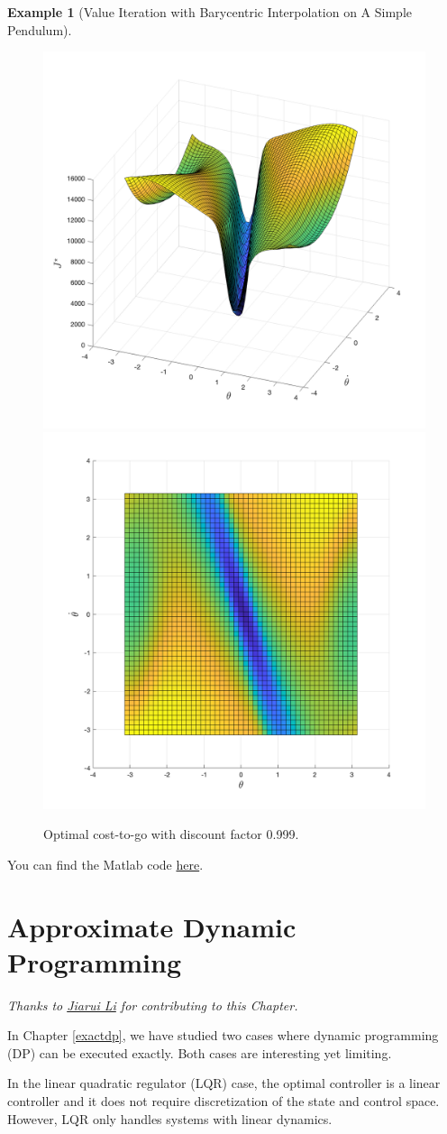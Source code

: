 \documentclass[
]{book}
\theoremstyle{definition}
\theoremstyle{definition}
\newtheorem{example}{Example}[chapter]
\theoremstyle{definition}
\theoremstyle{definition}
\theoremstyle{remark}
\begin{document}
\begin{example}[Value Iteration with Barycentric Interpolation on A Simple Pendulum]
\begin{figure}
{\centering \includegraphics[width=0.5\linewidth]{images/pendulum-VI-J-0.999-1} \includegraphics[width=0.5\linewidth]{images/pendulum-VI-J-0.999-2} 

}

\caption{Optimal cost-to-go with discount factor 0.999.}\label{fig:pendulum-VI-J-999}
\end{figure}

You can find the Matlab code \href{https://github.com/ComputationalRobotics/OptimalControlEstimation-Examples/blob/main/pendulum_value_iteration_barycentric.m}{here}.
\end{example}

\hypertarget{approximatedp}{%
\chapter{Approximate Dynamic Programming}\label{approximatedp}}

\emph{Thanks to \href{https://jrli.org/}{Jiarui Li} for contributing to this Chapter.}

In Chapter \ref{exactdp}, we have studied two cases where dynamic programming (DP) can be executed exactly. Both cases are interesting yet limiting.

In the linear quadratic regulator (LQR) case, the optimal controller is a linear controller and it does not require discretization of the state and control space. However, LQR only handles systems with linear dynamics.
\end{document}
